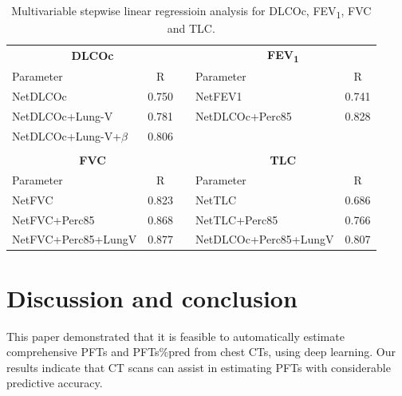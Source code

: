 \begin{table}[]
\centering
\caption{Multivariable stepwise linear regressioin analysis for DLCOc, FEV\textsubscript{1}, FVC and TLC.}
\begin{tabular}{lcllc}
\cline{1-2} \cline{4-5}
\multicolumn{2}{c}{\textbf{DLCOc}} &  & \multicolumn{2}{c}{\textbf{FEV\textsubscript{1}}} \\ \cline{1-2} \cline{4-5} 
Parameter                                & R                      &  & Parameter                                & R                     \\ \cline{1-2} \cline{4-5} 
NetDLCOc                                 & 0.750                  &  & NetFEV1                                  & 0.741                 \\
NetDLCOc+Lung-V                           & 0.781                  &  & NetDLCOc+Perc85                       & 0.828                 \\
NetDLCOc+Lung-V+$\beta$                      & 0.806                  &  &                                          &                       \\ \cline{1-2} \cline{4-5} 
                                         &                        &  &                                          &                       \\ \cline{1-2} \cline{4-5} 
\multicolumn{2}{c}{\textbf{FVC}}   &  & \multicolumn{2}{c}{\textbf{TLC}}  \\ \cline{1-2} \cline{4-5} 
Parameter                                & R                      &  & Parameter                                & R                     \\ \cline{1-2} \cline{4-5} 
NetFVC                                   & 0.823                  &  & NetTLC                                   & 0.686                 \\
NetFVC+Perc85                         & 0.868                  &  & NetTLC+Perc85                         & 0.766                 \\
NetFVC+Perc85+LungV                   & 0.877                  &  & NetDLCOc+Perc85+LungV                 & 0.807                 \\ \cline{1-2} \cline{4-5} 
\end{tabular}
\label{chap4_table_multiple_variable}
\end{table}

\section{Discussion and conclusion}
This paper demonstrated that it is feasible to automatically estimate comprehensive PFTs and PFTs\%pred from chest CTs, using deep learning. Our results indicate that CT scans can assist in estimating PFTs with considerable predictive accuracy. 

